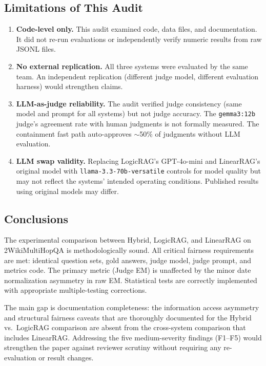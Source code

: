 \subsection{Limitations of This Audit}
\label{sec:audit-limitations}

\begin{enumerate}
\item \textbf{Code-level only.} This audit examined code, data files, and documentation. It did not re-run evaluations or independently verify numeric results from raw JSONL files.

\item \textbf{No external replication.} All three systems were evaluated by the same team. An independent replication (different judge model, different evaluation harness) would strengthen claims.

\item \textbf{LLM-as-judge reliability.} The audit verified judge consistency (same model and prompt for all systems) but not judge accuracy. The \texttt{gemma3:12b} judge's agreement rate with human judgments is not formally measured. The containment fast path auto-approves $\sim$50\% of judgments without LLM evaluation.

\item \textbf{LLM swap validity.} Replacing LogicRAG's GPT-4o-mini and LinearRAG's original model with \texttt{llama-3.3-70b-versatile} controls for model quality but may not reflect the systems' intended operating conditions. Published results using original models may differ.
\end{enumerate}

\subsection{Conclusions}
\label{sec:audit-conclusions}

The experimental comparison between Hybrid, LogicRAG, and LinearRAG on 2WikiMultiHopQA is methodologically sound. All critical fairness requirements are met: identical question sets, gold answers, judge model, judge prompt, and metrics code. The primary metric (Judge EM) is unaffected by the minor date normalization asymmetry in raw EM. Statistical tests are correctly implemented with appropriate multiple-testing corrections.

The main gap is documentation completeness: the information access asymmetry and structural fairness caveats that are thoroughly documented for the Hybrid vs.\ LogicRAG comparison are absent from the cross-system comparison that includes LinearRAG. Addressing the five medium-severity findings (F1--F5) would strengthen the paper against reviewer scrutiny without requiring any re-evaluation or result changes.

